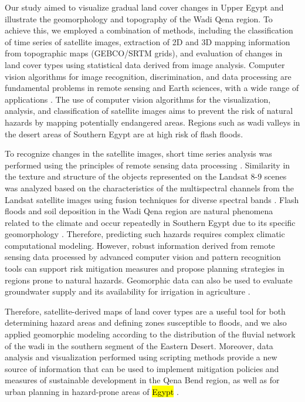 \documentclass[information,article,accept,pdftex,moreauthors]{Definitions/mdpi}
\begin{document}
{Our study aimed to visualize gradual land cover changes in Upper Egypt and illustrate the geomorphology and topography of the Wadi Qena region. To achieve this, we employed a combination of methods, including the classification of }time series of {satellite images, extraction of 2D and 3D mapping information from } topographic maps (GEBCO/SRTM grids){, }and {evaluation of changes in land cover types using }statistical data derived from image analysis. Computer vision algorithms {for }image recognition, discrimination{, }and data processing are fundamental {problems }in remote sensing and Earth sciences{, with }a wide range of applications 
\cite{ABDELKAREEM2015245,Lemenkova202231,ELQADI2020104696,Husseinetal1995,DHANYA2022211}. The use of computer vision algorithms for the visualization, analysis, and classification of satellite images {aims to prevent }the risk of natural hazards {by mapping }potentially endangered areas. {Regions such }as wadi valleys in the desert areas of Southern Egypt are at high {risk }of flash floods. 

{To recognize changes in the satellite images, }short time series analysis {was performed }using the principles of remote sensing data processing \cite{curran1985principles}. {Similarity }in the texture and structure of the objects represented on the Landsat 8-9 scenes was {analyzed }based on the characteristics of the multispectral channels from the Landsat satellite images using fusion techniques for {diverse }spectral bands \cite{4234117}. Flash floods and soil deposition in {the }Wadi Qena region are {natural phenomena related to the climate and occur repeatedly in } Southern Egypt due to its specific geomorphology \cite{ElShamy}. Therefore, predicting such hazards {requires }complex climatic computational modeling. {However, }robust information derived from remote sensing data processed by advanced computer vision and pattern recognition {tools can support risk mitigation measures }and propose planning strategies in regions prone to natural hazards. Geomorphic data can also be used to evaluate groundwater supply \cite{Abdelkhalek2021,Abdelkareem} and its availability for irrigation in agriculture \cite{Kamal2021}.

Therefore, satellite-derived {maps of }land cover types are a useful tool for {both }determining hazard areas and defining zones susceptible to floods{, and we also }applied geomorphic modeling according to the distribution of the fluvial network of the wadi in {the } southern segment of the Eastern Desert. Moreover, data analysis and visualization performed using scripting methods provide a new source of information that can be used to implement mitigation policies and measures of sustainable development in {the }Qena Bend region, as well as for urban planning in hazard-prone areas of \hl{Egypt} %
 \cite{ABDELAAL2020103671}. 
\end{document}
